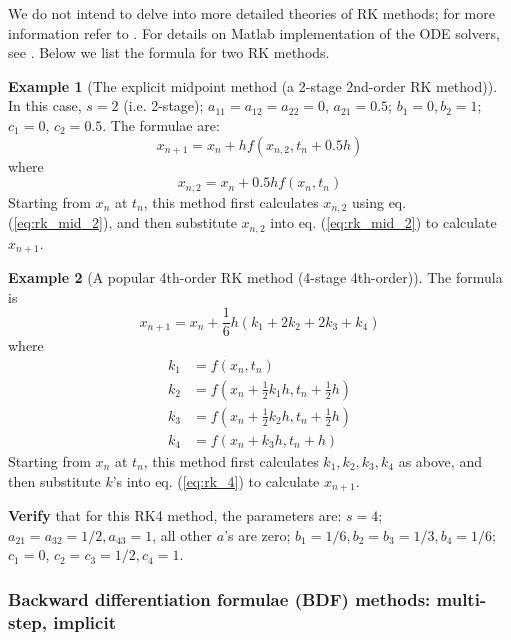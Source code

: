 \documentclass[a4paper,11pt]{article}
\theoremstyle{definition}
\newtheorem{exmp}{Example}[section]
\begin{document}
We do not intend to delve into more detailed theories of RK methods; for more information refer to \citep{Brenan1989}.
For details on Matlab implementation of the ODE solvers, see \citep{Shampine1997}.
Below we list the formula for two RK methods.

\begin{exmp}[The explicit midpoint method (a 2-stage 2nd-order RK method)]
\label{exmp:rk_mid}
In this case, $s=2$ (i.e. 2-stage); $a_{11} = a_{12} = a_{22} = 0$, $a_{21}=0.5$;
$b_1=0, b_2=1$; $c_1=0$, $c_2=0.5$. The formulae are:
\begin{equation} \label{eq:rk_mid_1}
	x_{n+1} = x_n + h f( x_{n, 2}, t_n + 0.5 h)
\end{equation}
\noindent where
\begin{equation} \label{eq:rk_mid_2}
	x_{n,2} = x_n + 0.5 h f( x_n, t_n)
\end{equation}
\noindent Starting from $x_n$ at $t_n$, this method first calculates $x_{n,2}$
using eq. (\ref{eq:rk_mid_2}), and then substitute $x_{n,2}$ into eq. (\ref{eq:rk_mid_2})
to calculate $x_{n+1}$.
\end{exmp}

\begin{exmp}[A popular 4th-order RK method (4-stage 4th-order)]
\label{exmp:rk_4}
The formula is
\begin{equation} \label{eq:rk_4}
	x_{n+1} = x_n + \frac{1}{6} h (k_1 + 2 k_2 + 2 k_3 + k_4)
\end{equation}
\noindent where
\begin{align} \label{eq:rk_2}
	k_1 &= f( x_n, t_n) \\
	k_2 &= f( x_n+\frac{1}{2} k_1 h, t_n + \frac{1}{2} h) \\
	k_3 &= f( x_n+\frac{1}{2} k_2 h, t_n + \frac{1}{2} h) \\
	k_4 &= f( x_n+ k_3 h, t_n + h)
\end{align}
\noindent Starting from $x_n$ at $t_n$, this method first calculates $k_1, k_2, k_3, k_4$ as above, 
and then substitute $k$'s into eq. (\ref{eq:rk_4})
to calculate $x_{n+1}$.

\textbf{Verify} that for this RK4 method, the parameters are:
$s=4$; $a_{21} = a_{32} = 1/2, a_{43} = 1$, all other $a$'s are zero;
$b_1=1/6, b_2=b_3=1/3, b_4=1/6$; $c_1=0$, $c_2=c_3=1/2, c_4=1$.

\end{exmp}


\subsubsection*{Backward differentiation formulae (BDF) methods: multi-step, implicit}
\end{document}
